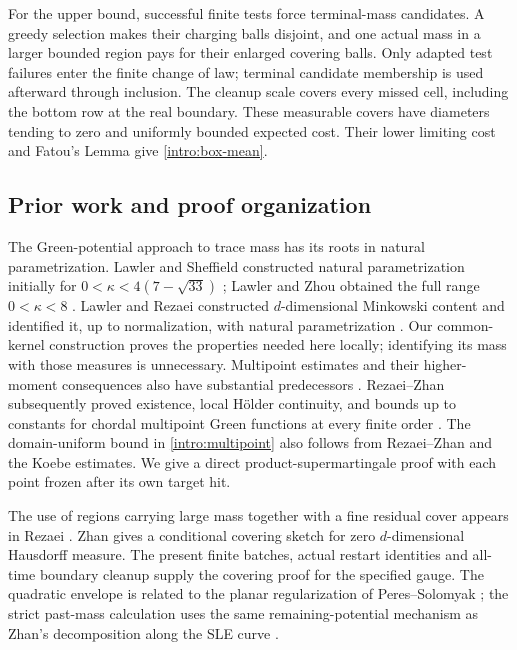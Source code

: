 For the upper bound, successful finite tests force terminal-mass
candidates. A greedy selection makes their charging balls disjoint, and
one actual mass in a larger bounded region pays for their enlarged
covering balls. Only adapted test failures enter the finite change of
law; terminal candidate membership is used afterward through inclusion.
The cleanup scale covers every missed cell, including the bottom row
at the real boundary. These measurable covers have diameters tending
to zero and uniformly bounded expected cost. Their lower limiting cost
and Fatou's Lemma give \eqref{intro:box-mean}.

\subsection{Prior work and proof organization}

The Green-potential approach to trace mass has its roots in natural
parametrization. Lawler and Sheffield constructed natural parametrization
initially for $0<\kappa<4(7-\sqrt{33})$
\cite[Theorem~3.1]{LawlerSheffield2011}; Lawler and Zhou obtained the
full range $0<\kappa<8$ \cite[Theorem~1]{LawlerZhou2013}.
Lawler and Rezaei constructed $d$-dimensional Minkowski content and
identified it, up to normalization, with natural parametrization
\cite[Theorem~1.1 and following discussion]{LawlerRezaei2015}.
Our common-kernel construction proves the properties needed here
locally; identifying its mass with those measures is unnecessary.
Multipoint estimates and their higher-moment consequences also have
substantial predecessors \cite{LawlerWerness2013,RezaeiZhan2017}.
Rezaei--Zhan subsequently proved existence, local H\"older continuity,
and bounds up to constants for chordal multipoint Green functions at
every finite order \cite[Theorem~1.1]{RezaeiZhan2018Green}.
The domain-uniform bound in \eqref{intro:multipoint} also follows from
Rezaei--Zhan \cite[Theorem~1.1]{RezaeiZhan2017} and the Koebe estimates.
We give a direct product-supermartingale proof with each point frozen
after its own target hit.

The use of regions carrying large mass together with a fine residual
cover appears in Rezaei \cite[Section~3, equations~(9)--(11)]{Rezaei2018}.
Zhan \cite[Remark~4.5]{Zhan2019Optimal} gives a conditional covering
sketch for zero $d$-dimensional Hausdorff measure.
The present finite batches, actual restart identities and all-time
boundary cleanup supply the covering proof for the specified gauge.
The quadratic envelope is related to the planar regularization of
Peres--Solomyak \cite[Lemma~1.2 and Section~5]{PeresSolomyak2005};
the strict past-mass calculation uses the same remaining-potential
mechanism as Zhan's decomposition along the SLE curve
\cite[Proposition~2.2 and equations~(4.3)--(4.5)]{Zhan2019Decomposition}.

